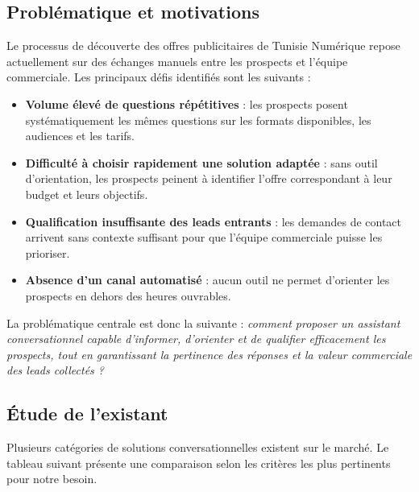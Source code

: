 \documentclass[12pt,a4paper]{report}
\begin{document}
\subsection{Problématique et motivations}

Le processus de découverte des offres publicitaires de Tunisie Numérique repose
actuellement sur des échanges manuels entre les prospects et l'équipe commerciale. Les
principaux défis identifiés sont les suivants :

\begin{itemize}
  \item \textbf{Volume élevé de questions répétitives} : les prospects posent systématiquement
  les mêmes questions sur les formats disponibles, les audiences et les tarifs.
  \item \textbf{Difficulté à choisir rapidement une solution adaptée} : sans outil d'orientation,
  les prospects peinent à identifier l'offre correspondant à leur budget et leurs objectifs.
  \item \textbf{Qualification insuffisante des leads entrants} : les demandes de contact arrivent
  sans contexte suffisant pour que l'équipe commerciale puisse les prioriser.
  \item \textbf{Absence d'un canal automatisé} : aucun outil ne permet d'orienter les prospects
  en dehors des heures ouvrables.
\end{itemize}

La problématique centrale est donc la suivante : \textit{comment proposer un assistant
conversationnel capable d'informer, d'orienter et de qualifier efficacement les prospects,
tout en garantissant la pertinence des réponses et la valeur commerciale des leads collectés ?}

\subsection{Étude de l'existant}

Plusieurs catégories de solutions conversationnelles existent sur le marché. Le tableau
suivant présente une comparaison selon les critères les plus pertinents pour notre besoin.
\end{document}

